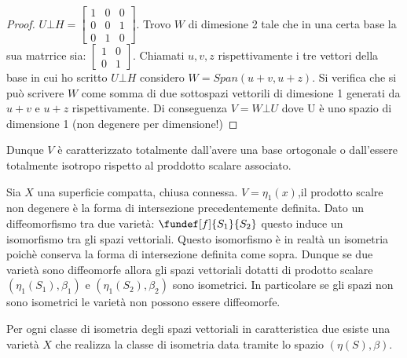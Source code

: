 \begin{proof}
 $U \bot H = \left[\begin{matrix} 1 & 0 & 0 \\ 0 & 0 & 1 \\ 0 & 1 & 0 \end{matrix}\right]$. Trovo $W$ di dimesione 2 tale che in una certa base la sua matrrice sia:
 $ \left[\begin{matrix} 1 & 0 \\ 0 & 1 \end{matrix}\right]$. Chiamati $u, v, z$ rispettivamente i tre vettori della base in cui ho scritto $U \bot H$ considero $W = Span(u+v, u+z)$.
 Si verifica che si può scrivere $W$ come somma di due sottospazi vettorili di dimesione 1 generati da $u+v$ e $u+z$ rispettivamente. Di conseguenza $V = W \bot U$ dove U è uno spazio di dimensione 1  (non degenere per dimensione!)
\end{proof}

Dunque $V$ è caratterizzato totalmente dall'avere una base ortogonale o dall'essere totalmente isotropo rispetto al proddotto scalare associato.

Sia $X$ una superficie compatta, chiusa connessa. $V = \eta _1(x)$,il prodotto scalre non degenere è la forma di intersezione precedentemente definita. Dato un diffeomorfismo tra due varietà:
$\fundef[f]{S_1}{S_2}$ questo induce un isomorfismo tra gli spazi vettoriali. Questo isomorfismo è in realtà un isometria poichè conserva la forma di intersezione definita come sopra.
Dunque se due varietà sono diffeomorfe allora gli spazi vettoriali dotatti di prodotto scalare $(\eta _1(S_1), \beta_1)$ e $(\eta _1(S_2), \beta_2)$ sono isometrici. In particolare se gli spazi non sono isometrici le varietà non possono essere diffeomorfe.

Per ogni classe di isometria degli spazi vettoriali in caratteristica due esiste  una varietà $X$ che realizza la classe di isometria data tramite lo spazio $(\eta(S), \beta)$.


